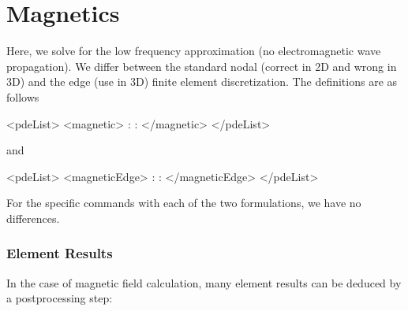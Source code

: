 \newpage
\section{Magnetics}
Here, we solve for the low frequency approximation (no electromagnetic
wave propagation). We differ between the standard nodal (correct in
2D and wrong in 3D) and the edge (use in 3D) finite element
discretization. The definitions are as follows
\begin{xmllisting}
<pdeList>
   <magnetic>
         :
         :
   </magnetic>
</pdeList>
\end{xmllisting}
and
\begin{xmllisting}
<pdeList>
  <magneticEdge>
         :
         :
   </magneticEdge>
</pdeList>
\end{xmllisting} 

For the specific commands with each of the two formulations, we have
no differences.

\subsubsection{Element Results}
In the case of magnetic field calculation, many element results can be
deduced by a postprocessing step:


